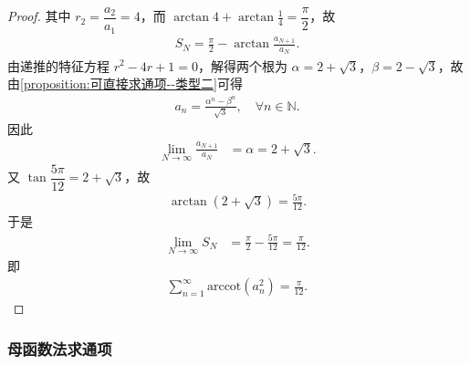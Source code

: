 \documentclass[../../main.tex]{subfiles}%
\begin{document}
\begin{proof}
其中 $r_2=\dfrac{a_2}{a_1}=4$，而 $\arctan4+\arctan\frac14=\dfrac{\pi}{2}$，故
\begin{align*}
S_N=\frac{\pi}{2}-\arctan\frac{a_{N+1}}{a_N}.
\end{align*}
由递推的特征方程 $r^2-4r+1=0$，解得两个根为 $\alpha=2+\sqrt3$，$\beta=2-\sqrt3$，故由\cref{proposition:可直接求通项--类型二}可得
\begin{align*}
a_n=\frac{\alpha^n-\beta^n}{\sqrt3},\quad \forall n\in \mathbb{N}.
\end{align*}
因此
\begin{align*}
\lim_{N\to\infty}\frac{a_{N+1}}{a_N}
&=\alpha=2+\sqrt3.
\end{align*}
又 $\tan\dfrac{5\pi}{12}=2+\sqrt3$，故
\begin{align*}
\arctan(2+\sqrt3)=\frac{5\pi}{12}.
\end{align*}
于是
\begin{align*}
\lim_{N\to\infty}S_N
&=\frac{\pi}{2}-\frac{5\pi}{12}
=\frac{\pi}{12}.
\end{align*}
即
\begin{align*}
\sum_{n=1}^{\infty}\text{arccot}(a_n^2)=\frac{\pi}{12}.
\end{align*}
\end{proof}



\subsubsection{母函数法求通项}
\end{document}
